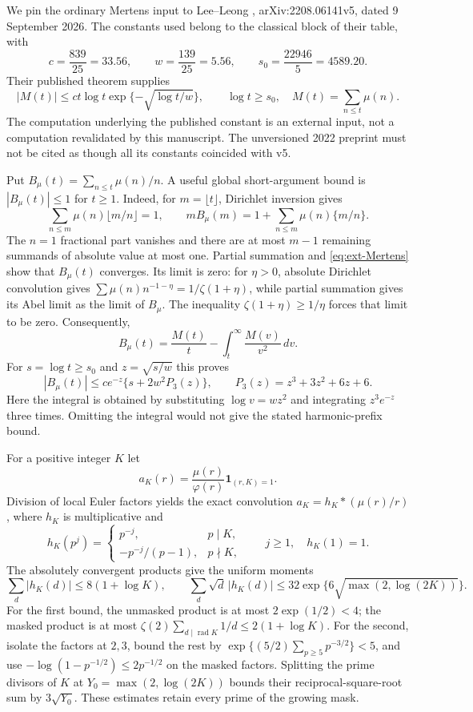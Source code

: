 \documentclass[11pt,a4paper]{article}
\theoremstyle{definition}
\theoremstyle{remark}
\begin{document}
We pin the ordinary Mertens input to Lee--Leong
\cite{LL}, arXiv:2208.06141v5, dated 9 September 2026. The constants used
belong to the classical block of their table, with
\[
 c=\frac{839}{25}=33.56,\qquad
 w=\frac{139}{25}=5.56,\qquad s_0=\frac{22946}{5}=4589.20.
\]
Their published theorem supplies
\begin{equation}\label{eq:ext-Mertens}
 |M(t)|\leq ct\log t\exp\{-\sqrt{\log t/w}\},
 \qquad \log t\geq s_0,
 \quad M(t)=\sum_{n\leq t}\mu(n).
\end{equation}
The computation underlying the published constant is an external input,
not a computation revalidated by this manuscript. The unversioned 2022
preprint must not be cited as though all its constants coincided with v5.

Put $B_\mu(t)=\sum_{n\leq t}\mu(n)/n$. A useful global short-argument
bound is $|B_\mu(t)|\leq1$ for $t\geq1$. Indeed, for $m=\lfloor t\rfloor$,
Dirichlet inversion gives
\[
 \sum_{n\leq m}\mu(n)\lfloor m/n\rfloor=1,
 \qquad mB_\mu(m)=1+\sum_{n\leq m}\mu(n)\{m/n\}.
\]
The $n=1$ fractional part vanishes and there are at most $m-1$
remaining summands of absolute value at most one.
Partial summation and \eqref{eq:ext-Mertens} show that $B_\mu(t)$
converges. Its limit is zero: for $\eta>0$, absolute Dirichlet
convolution gives $\sum\mu(n)n^{-1-\eta}=1/\zeta(1+\eta)$, while
partial summation gives its Abel limit as the limit of $B_\mu$.
The inequality $\zeta(1+\eta)\geq1/\eta$ forces that limit to be zero.
Consequently,
\[
 B_\mu(t)=\frac{M(t)}t-\int_t^\infty\frac{M(v)}{v^2}\,dv.
\]
For $s=\log t\geq s_0$ and $z=\sqrt{s/w}$ this proves
\begin{equation}\label{eq:ext-harmonic}
 |B_\mu(t)|\leq c e^{-z}\{s+2w^2P_3(z)\},
 \qquad P_3(z)=z^3+3z^2+6z+6.
\end{equation}
Here the integral is obtained by substituting $\log v=wz^2$ and
integrating $z^3e^{-z}$ three times. Omitting the integral would not
give the stated harmonic-prefix bound.

For a positive integer $K$ let
\[
 a_K(r)=\frac{\mu(r)}{\varphi(r)}\mathbf1_{(r,K)=1}.
\]
Division of local Euler factors yields the exact convolution
$a_K=h_K*(\mu(r)/r)$, where $h_K$ is multiplicative and
\[
 h_K(p^j)=\begin{cases}
 p^{-j},&p\mid K,\\
 -p^{-j}/(p-1),&p\nmid K,
 \end{cases}\qquad j\geq1,
 \quad h_K(1)=1.
\]
The absolutely convergent products give the uniform moments
\begin{equation}\label{eq:ext-maskmoments}
 \sum_d|h_K(d)|\leq8(1+\log K),\qquad
 \sum_d\sqrt d\,|h_K(d)|
 \leq32\exp\{6\sqrt{\max(2,\log(2K))}\}.
\end{equation}
For the first bound, the unmasked product is at most
$2\exp(1/2)<4$; the masked product is at most
$\zeta(2)\sum_{d\mid\operatorname{rad}K}1/d\leq2(1+\log K)$.
For the second, isolate the factors at $2,3$, bound the rest by
$\exp\{(5/2)\sum_{p\geq5}p^{-3/2}\}<5$, and use
$-\log(1-p^{-1/2})\leq2p^{-1/2}$ on the masked factors.
Splitting the prime divisors of $K$ at
$Y_0=\max(2,\log(2K))$ bounds their reciprocal-square-root sum by
$3\sqrt{Y_0}$. These estimates retain every prime of the growing mask.
\end{document}
